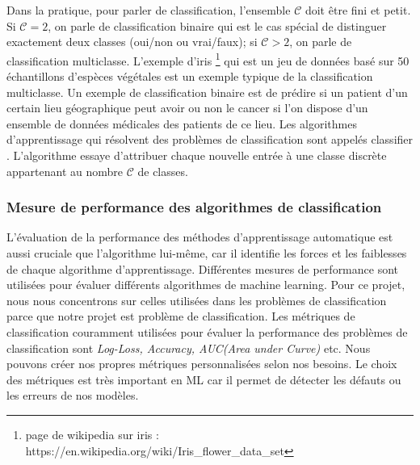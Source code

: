 \documentclass[12pt, french]{report}
\begin{document}
Dans la pratique, pour parler de classification, l'ensemble $\mathcal{C}$ doit être fini et petit. Si $\mathcal{C} = 2$, on parle de classification binaire qui est le cas spécial de distinguer exactement deux classes (oui/non ou vrai/faux); si $\mathcal{C} > 2$, on parle de classification multiclasse. L'exemple d'iris \footnote{page de wikipedia sur iris : https://en.wikipedia.org/wiki/Iris\_flower\_data\_set} qui est un jeu de données basé sur 50 échantillons d'espèces végétales est un exemple typique de la classification multiclasse. Un exemple de classification binaire est de prédire si un patient d'un certain lieu géographique peut avoir ou non le cancer si l'on dispose d'un ensemble de données médicales des patients de ce lieu. Les algorithmes d'apprentissage qui résolvent des problèmes de classification sont appelés  \guillemotleft classifier \guillemotright. L'algorithme essaye d'attribuer chaque nouvelle entrée à une classe discrète appartenant au nombre $\mathcal{C}$ de classes. \cite{key44, key41, key42}


\subsubsection{Mesure de performance des algorithmes de classification}
L'évaluation de la performance des méthodes d'apprentissage automatique est aussi cruciale que l'algorithme lui-même, car il identifie les forces et les faiblesses de chaque algorithme d'apprentissage. Différentes mesures de performance sont utilisées pour évaluer différents algorithmes de machine learning. Pour ce projet, nous nous concentrons sur celles utilisées dans les problèmes de classification parce que notre projet est problème de classification. Les métriques  de classification couramment utilisées pour évaluer la performance des problèmes de classification sont \textit{Log-Loss, Accuracy, AUC(Area under Curve)} etc. Nous pouvons créer nos propres métriques personnalisées selon nos besoins. Le choix des métriques est très important en ML car il permet de détecter les défauts ou les erreurs de nos modèles. \\
\end{document}

